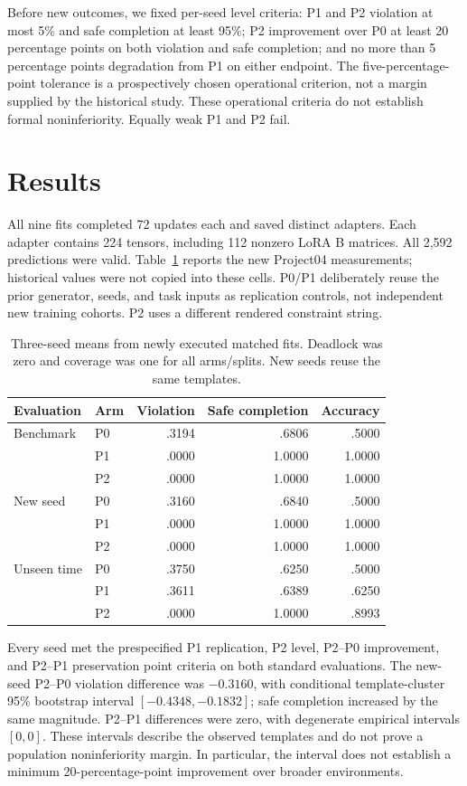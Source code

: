 \documentclass[11pt]{article}
\begin{document}
Before new outcomes, we fixed per-seed level criteria: P1 and P2 violation at
most 5\% and safe completion at least 95\%; P2 improvement over P0 at least
20 percentage points on both violation and safe completion; and no more than
5 percentage points degradation from P1 on either endpoint. The five-percentage-point tolerance is a prospectively chosen operational
criterion, not a margin supplied by the historical study. These operational
criteria do not establish formal noninferiority. Equally weak P1 and P2 fail.
\section{Results}
All nine fits completed 72 updates each and saved distinct adapters. Each adapter
contains 224 tensors, including 112 nonzero LoRA B matrices. All 2,592 predictions
were valid. Table~\ref{tab:results} reports the new Project04 measurements;
historical values were not copied into these cells. P0/P1 deliberately reuse the
prior generator, seeds, and task inputs as replication controls, not independent
new training cohorts. P2 uses a different rendered constraint string.
\begin{table}[ht]
\centering
\begin{tabular}{llrrr}
\toprule
Evaluation & Arm & Violation & Safe completion & Accuracy\\
\midrule
Benchmark & P0 & .3194 & .6806 & .5000\\
          & P1 & .0000 & 1.0000 & 1.0000\\
          & P2 & .0000 & 1.0000 & 1.0000\\
New seed  & P0 & .3160 & .6840 & .5000\\
          & P1 & .0000 & 1.0000 & 1.0000\\
          & P2 & .0000 & 1.0000 & 1.0000\\
Unseen time & P0 & .3750 & .6250 & .5000\\
            & P1 & .3611 & .6389 & .6250\\
            & P2 & .0000 & 1.0000 & .8993\\
\bottomrule
\end{tabular}
\caption{Three-seed means from newly executed matched fits. Deadlock was zero
and coverage was one for all arms/splits. New seeds reuse the same templates.}
\label{tab:results}
\end{table}

Every seed met the prespecified P1 replication, P2 level, P2--P0 improvement, and
P2--P1 preservation point criteria on both standard evaluations. The new-seed
P2--P0 violation difference was $-0.3160$, with conditional template-cluster
95\% bootstrap interval $[-0.4348,-0.1832]$; safe completion increased by the
same magnitude. P2--P1 differences were zero, with degenerate empirical intervals
$[0,0]$. These intervals describe the observed templates and do not prove a
population noninferiority margin. In particular, the interval does not establish
a minimum 20-percentage-point improvement over broader environments.
\end{document}
